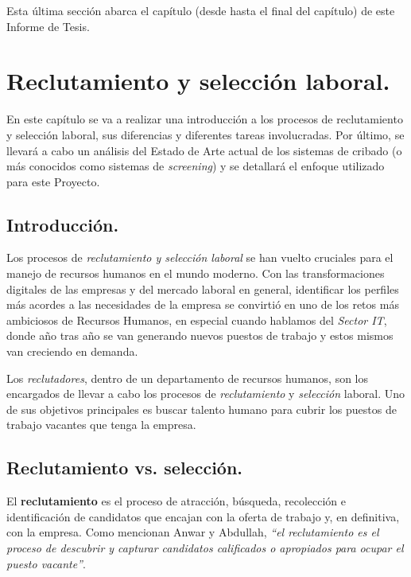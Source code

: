 \documentclass[12pt,a4paper]{article}
\begin{document}
\begin{sloppypar}
\begin{enumerate}
Esta última sección abarca el capítulo \textit{} (desde \textit{} hasta el final del capítulo) de este Informe de Tesis.
\end{enumerate}

\cleardoublepage    %

\section{Reclutamiento y selección laboral.}\label{2.ReclutamientolaboralenIT}

En este capítulo se va a realizar una introducción a los procesos de reclutamiento y selección laboral, sus diferencias y diferentes tareas involucradas. Por último, se llevará a cabo un análisis del Estado de Arte actual de los sistemas de cribado (o más conocidos como sistemas de \textit{screening}) y se detallará el enfoque utilizado para este Proyecto.

\subsection{Introducción.}

Los procesos de \textit{reclutamiento y selección laboral} se han vuelto cruciales para el manejo de recursos humanos en el mundo moderno. Con las transformaciones digitales de las empresas y del mercado laboral en general, identificar los perfiles más acordes a las necesidades de la empresa se convirtió en uno de los retos más ambiciosos de Recursos Humanos, en especial cuando hablamos del \textit{Sector IT}, donde año tras año se van generando nuevos puestos de trabajo y estos mismos van creciendo en demanda. 

Los \textit{reclutadores}, dentro de un departamento de recursos humanos, son los encargados de llevar a cabo los procesos de \textit{reclutamiento} y \textit{selección} laboral. Uno de sus objetivos principales es buscar talento humano para cubrir los puestos de trabajo vacantes que tenga la empresa.

\subsection{Reclutamiento vs. selección.}\label{SeleccionYReclutamiento}

El \textbf{reclutamiento} es el proceso de atracción, búsqueda, recolección e identificación de candidatos que encajan con la oferta de trabajo y, en definitiva, con la empresa. Como mencionan Anwar y Abdullah, \textit{``el reclutamiento es el proceso de descubrir y capturar candidatos calificados o apropiados para ocupar el puesto vacante''}\cite{seleccion_reclutamiento_2}.


\end{sloppypar}
\end{document}
